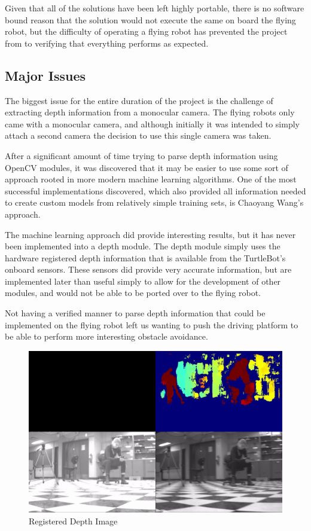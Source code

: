 \documentclass{article}[12]
\begin{document}
Given that all of the solutions have been left highly portable, there is no software bound reason that the solution would not execute the same on board the flying robot, but the difficulty of operating a flying robot has prevented the project from to verifying that everything performs as expected.

\subsection{Major Issues}

The biggest issue for the entire duration of the project is the challenge of extracting depth information from a monocular camera. The flying robots only came with a monocular camera, and although initially it was intended to simply attach a second camera the decision to use this single camera was taken.

After a significant amount of time trying to parse depth information using OpenCV modules, it was discovered that it may be easier to use some sort of approach rooted in more modern machine learning algorithms. One of the most successful implementations discovered, which also provided all information needed to create custom models from relatively simple training sets, is Chaoyang Wang's approach.\cite{Wang_2018_CVPR} 

The machine learning approach did provide interesting results, but it has never been implemented into a depth module. The depth module simply uses the hardware registered depth information that is available from the TurtleBot's onboard sensors. These sensors did provide very accurate information, but are implemented later than useful simply to allow for the development of other modules, and would not be able to be ported over to the flying robot. 

Not having a verified manner to parse depth information that could be implemented on the flying robot left us wanting to push the driving platform to be able to perform more interesting obstacle avoidance.

\begin{figure}[H]
	\centering
	\includegraphics[width=0.6\linewidth]{stereo}
	\caption{Registered Depth Image}
	\label{fig:stereostereo}
\end{figure}
\end{document}
